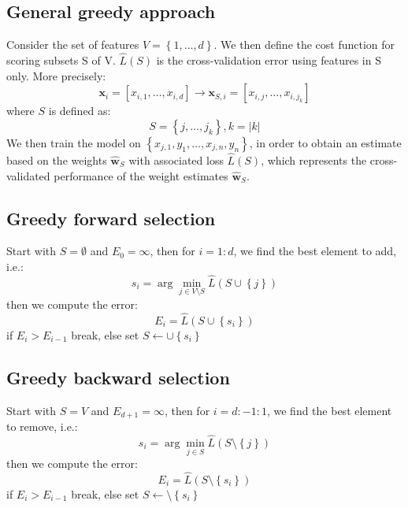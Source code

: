 \documentclass[a4paper,10pt,twoside]{article}
\begin{document}
\subsection{General greedy approach}
Consider the set of features $V=\left\{1,\ldots, d\right\}$. We then define the cost function for scoring subsets S of V. $\hat{L}(S)$ is the cross-validation error using features in S only. More precisely:
\begin{equation*}
    \mathbf{x}_i=[x_{i,1},\ldots,x_{i,d}]\rightarrow\mathbf{x}_{S,i}=[x_{i,j},\ldots,x_{i,j_k}]
\end{equation*}
where $S$ is defined as:
\begin{equation*}
    S=\left\{j,\ldots,j_{k}\right\}, k=|k|
\end{equation*}
We then train the model on $\left\{x_{j,1},y_1,\ldots,x_{j,n},y_n\right\}$, in order to obtain an estimate based on the weights $\hat{\mathbf{w}}_S$ with associated loss $\hat{L}(S)$, which represents the cross-validated performance of the weight estimates $\hat{\mathbf{w}}_S$.

\subsection{Greedy forward selection}
Start with $S=\emptyset$ and $E_0=\infty$, then for $i=1:d$, we find the best element to add, i.e.:
\begin{equation*}
    s_i=\arg\min_{j\in V \setminus S}\hat{L}(S\cup \left\{j\right\})
\end{equation*}
then we compute the error:
\begin{equation*}
    E_i=\hat{L}(S\cup\left\{s_i\right\})
\end{equation*}
if $E_i>E_{i-1}$ break, else set $S\leftarrow \cup\left\{s_i\right\}$

\subsection{Greedy backward selection}
Start with $S=V$ and $E_{d+1}=\infty$, then for $i=d:-1:1$, we find the best element to remove, i.e.:
\begin{equation*}
    s_i=\arg\min_{j\in S}\hat{L}(S\setminus\left\{j\right\})
\end{equation*}
then we compute the error:
\begin{equation*}
    E_i=\hat{L}(S\setminus\left\{s_i\right\})
\end{equation*}
if $E_i>E_{i-1}$ break, else set $S\leftarrow \setminus\left\{s_i\right\}$
\end{document}
